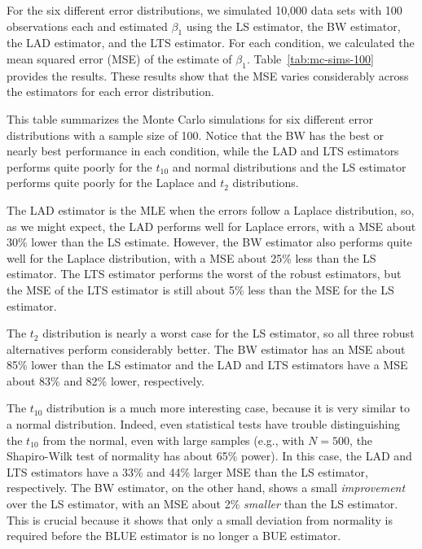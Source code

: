 \documentclass[12pt]{article}
\begin{document}
For the six different error distributions, we simulated 10,000 data sets with 100 observations each and estimated $\beta_1$ using the LS estimator, the BW estimator, the LAD estimator, and the LTS estimator. 
For each condition, we calculated the mean squared error (MSE) of the estimate of $\beta_1$. 
Table~\ref{tab:mc-sims-100} provides the results. 
These results show that the MSE varies considerably across the estimators for each error distribution.

\begin{table}[h!]
{\scriptsize

}
\caption{This table summarizes the Monte Carlo simulations for six different error distributions with a sample size of 100. 
Notice that the BW has the best or nearly best performance in each condition, while the LAD and LTS estimators performs quite poorly for the $t_{10}$ and normal distributions and the LS estimator performs quite poorly for the Laplace and $t_2$ distributions.}\label{tab:mc-sims-100}
\end{table}

The LAD estimator is the MLE when the errors follow a Laplace distribution, so, as we might expect, the LAD performs well for Laplace errors, with a MSE about 30\% lower than the LS estimate. 
However, the BW estimator also performs quite well for the Laplace distribution, with a MSE about 25\% less than the LS estimator. The LTS estimator performs the worst of the robust estimators, but the MSE of the LTS estimator is still about 5\% less than the MSE for the LS estimator.

The $t_2$ distribution is nearly a worst case for the LS estimator, so all three robust alternatives perform considerably better. 
The BW estimator has an MSE about 85\% lower than the LS estimator and the LAD and LTS estimators have a MSE about 83\% and 82\% lower, respectively. 

The $t_{10}$ distribution is a much more interesting case, because it is very similar to a normal distribution. 
Indeed, even statistical tests have trouble distinguishing the $t_{10}$ from the normal, even with large samples (e.g., with $N = 500$, the Shapiro-Wilk test of normality has about 65\% power). 
In this case, the LAD and LTS estimators have a 33\% and 44\% larger MSE than the LS estimator, respectively.
The BW estimator, on the other hand, shows a small \textit{improvement} over the LS estimator, with an MSE about 2\% \textit{smaller} than the LS estimator. 
This is crucial because it shows that only a small deviation from normality is required before the BLUE estimator is no longer a BUE estimator. 
\end{document}
